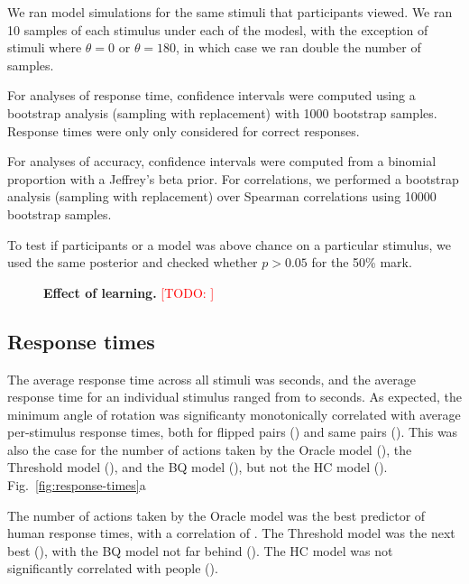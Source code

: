 \documentclass[10pt,letterpaper]{article}
\newcommand{\TODO}[1]{\textcolor{red}{[TODO: #1]}}
\newcommand{\Oc}[0]{Oracle}
\newcommand{\Th}[0]{Threshold}
\newcommand{\Hc}[0]{HC}
\newcommand{\Bq}[0]{BQ}
\begin{document}
We ran model simulations for the same stimuli that participants
viewed. We ran 10 samples of each stimulus under each of the modesl,
with the exception of stimuli where $\theta=0$ or $\theta=180$, in
which case we ran double the number of samples.

For analyses of response time, confidence intervals were computed
using a bootstrap analysis (sampling with replacement) with 1000
bootstrap samples. Response times were only only considered for
correct responses.

For analyses of accuracy, confidence intervals were
computed from a binomial proportion with a Jeffrey's beta prior.  For
correlations, we performed a bootstrap analysis (sampling with
replacement) over Spearman correlations using 10000 bootstrap samples.

To test if participants or a model was above chance on a particular
stimulus, we used the same posterior and checked whether $p>0.05$ for
the 50\% mark.

\begin{figure}[t]
  \centering
  \caption{\textbf{Effect of learning.} \TODO{}}
  \label{fig:learning}
\end{figure}

\subsection{Response times}

The average response time across all stimuli was \ExpTime{} seconds,
and the average response time for an individual stimulus ranged from
\ExpTimeMin{} to \ExpTimeMax{} seconds.  As expected, the minimum
angle of rotation was significanty monotonically correlated with
average per-stimulus response times, both for flipped pairs
(\ExpThetaTimeCorrFlipped{}) and same pairs
(\ExpThetaTimeCorrSame{}). This was also the case for the number of
actions taken by the \Oc{} model (\OcThetaTimeCorr{}), the \Th{} model
(\ThThetaTimeCorr{}), and the \Bq{} model (\BqThetaTimeCorr{}), but
not the \Hc{} model
(\HcThetaTimeCorr{}). Fig.~\ref{fig:response-times}a

The number of actions taken by the \Oc{} model was the best predictor
of human response times, with a correlation of \ExpOcTimeCorr{}. The
\Th{} model was the next best (\ExpThTimeCorr{}), with the \Bq{} model
not far behind (\ExpBqTimeCorr{}). The \Hc{} model was not
significantly correlated with people (\ExpHcTimeCorr{}).
\end{document}
